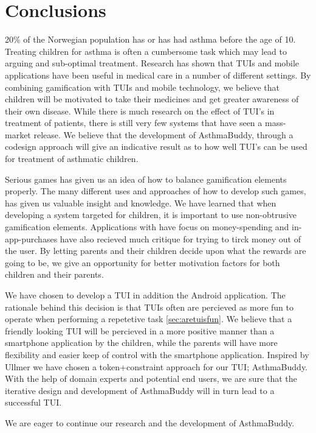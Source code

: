 \chapter{Conclusions}
\label{conclusions}

20\% of the Norwegian population has or has had asthma before the age of 10. Treating children for asthma is often a cumbersome task which may lead to arguing and sub-optimal treatment. Research has shown that TUIs and mobile applications have been useful in medical care in a number of different settings. By combining gamification with TUIs and mobile technology, we believe that children will be motivated to take their medicines and get greater awareness of their own disease. While there is much research on the effect of TUI's in treatment of patients, there is still very few systems that have seen a mass-market release. We believe that the development of AsthmaBuddy, through a codesign approach will give an indicative result as to how well TUI's can be used for treatment of asthmatic children.


Serious games has given us an idea of how to balance gamification elements properly. The many different uses and approaches of how to develop such games, has given us valuable insight and knowledge. We have learned that when developing a system targeted for children, it is important to use non-obtrusive gamification elements. Applications with have focus on money-spending and in-app-purchases have also recieved much critique for trying to tirck money out of the user. By letting parents and their children decide upon what the rewards are going to be, we give an opportunity for better motivation factors for both children and their parents. 


We have chosen to develop a TUI in addition the Android application. The rationale behind this decision is that TUIs often are percieved as more fun to operate when performing a repetetive task \ref{sec:aretuisfun}. We believe that a friendly looking TUI will be percieved in a more positive manner than a smartphone application by the children, while the parents will have more flexibility and easier keep of control with the smartphone application. Inspired by Ullmer \cite{ullmer2002tangible} we have chosen a token+constraint approach for our TUI; AsthmaBuddy. With the help of domain experts and potential end users, we are sure that the iterative design and development of AsthmaBuddy will in turn lead to a successful TUI. 

We are eager to continue our research and the development of AsthmaBuddy. 


